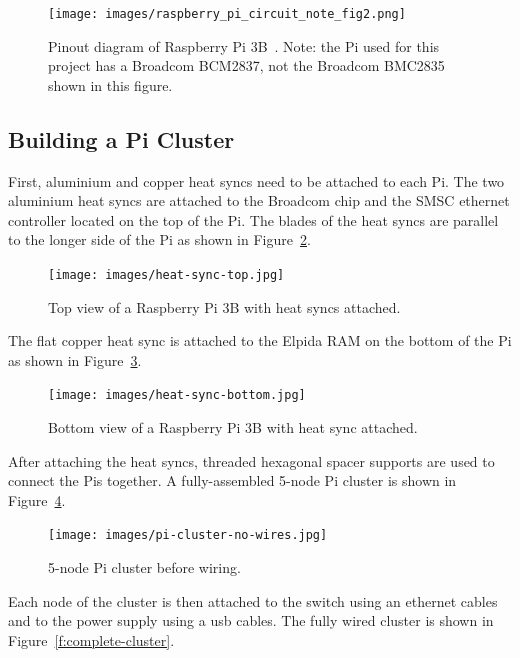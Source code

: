 \begin{figure}[!ht]
  \centering\texttt{[image: images/raspberry\_pi\_circuit\_note\_fig2.png]} \caption{Pinout
  diagram of Raspberry Pi 3B~\cite{hid-sp18-419-pi-pinout}. Note: the
  Pi used for this project has a Broadcom BCM2837, not the Broadcom
  BMC2835 shown in this figure.}\label{f:pinout-digram}
\end{figure}

\subsection{Building a Pi Cluster}
First, aluminium and copper heat syncs need to be attached to each
Pi. The two aluminium heat syncs are attached to the Broadcom chip and
the SMSC ethernet controller located on the top of the Pi. The blades
of the heat syncs are parallel to the longer side of the Pi as shown
in Figure~\ref{f:heat-sync-top}.

\begin{figure}[!ht]
  \centering\texttt{[image: images/heat-sync-top.jpg]} \caption{Top
  view of a Raspberry Pi 3B with heat syncs
  attached.}\label{f:heat-sync-top}
\end{figure}

The flat copper heat sync is attached to the Elpida RAM on the bottom
of the Pi as shown in Figure~\ref{f:heat-sync-bottom}.

\begin{figure}[!ht]
  \centering\texttt{[image: images/heat-sync-bottom.jpg]} \caption{Bottom
  view of a Raspberry Pi 3B with heat sync
  attached.}\label{f:heat-sync-bottom}
\end{figure}

After attaching the heat syncs, threaded hexagonal spacer supports are
used to connect the Pis together. A fully-assembled 5-node Pi cluster
is shown in Figure~\ref{f:cluster-no-wires}.

\begin{figure}[!ht]
  \centering\texttt{[image: images/pi-cluster-no-wires.jpg]}
  \caption{5-node Pi cluster before wiring.}\label{f:cluster-no-wires}
\end{figure}

Each node of the cluster is then attached to the switch using an
ethernet cables and to the power supply using a usb cables. The fully
wired cluster is shown in Figure~\ref{f:complete-cluster}.

